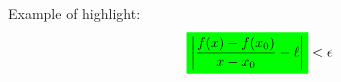 \documentclass{article}
\newcommand{\Abs}[1]{\left\lvert#1\right\rvert}
\newcommand{\highlight}[2][yellow]{\mathchoice
  {\colorbox{#1}{$\displaystyle#2$}}
  {\colorbox{#1}{$\textstyle#2$}}
  {\colorbox{#1}{$\scriptstyle#2$}}
  {\colorbox{#1}{$\scriptscriptstyle#2$}}}
\begin{document}
Example of highlight:
\begin{alignat*}{2}
    \highlight[green]{\Abs{\frac{f(x) - f(x_0)}{x-x_0} - \ell}} < \epsilon
\end{alignat*}
\end{document}
